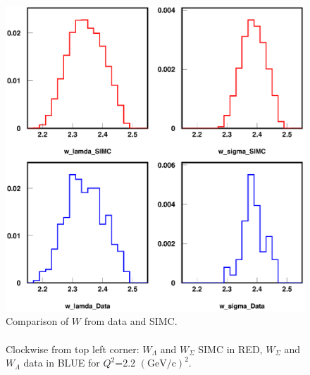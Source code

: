 \begin{figure}[!tbp]
  \centering
  \includegraphics[width=0.8\columnwidth]{com_plot_w_2}
  \caption[Comparison of $W$ from data and SIMC.]{\label{fig:com_plot_w_2}Comparison of $W$ from data and SIMC.\\\\ Clockwise from top left corner: $W_\Lambda$ and $W_\Sigma$ SIMC in RED, $W_\Sigma$ and $W_\Lambda$ data in BLUE for $Q^2$=2.2 $(\mathrm{GeV/c})^2$.}
\end{figure}


